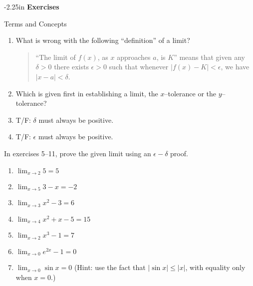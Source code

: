 \begin{adjustwidth*}{}{-2.25in}
\textbf{{\large Exercises}}
\setlength{\columnsep}{25pt}
\begin{multicols*}{2}
\noindent Terms and Concepts \small

\begin{enumerate}[1)]
\item What is wrong with the following ``definition'' of a limit?
	\begin{quote}
``The limit of $f(x)$, as $x$ approaches $a$, is $K$'' means that given any $\delta>0$ there exists $\epsilon>0$ such that whenever $|f(x)-K|< \epsilon$, we have $|x-a|<\delta$.
	\end{quote}
\item Which is given first in establishing a limit, the $x$--tolerance or the $y$--tolerance?
\item T/F: $\delta$ must always be positive.
\item T/F: $\epsilon$ must always be positive.
\end{enumerate} 

 \small

\noindent In exercises 5--11, prove the given limit using an $\epsilon - \delta$ proof.

\begin{enumerate}[1),resume]
\item {$\displaystyle \lim_{x\to 2} 5 = 5$}
\item {$\displaystyle \lim_{x\to 5} 3-x = -2$}
\item {$\displaystyle \lim_{x\to 3} x^2-3 = 6$}
\item {$\displaystyle \lim_{x\to 4} x^2+x-5 = 15$}
\item {$\displaystyle \lim_{x\to 2} x^3-1 = 7$}
\item {$\displaystyle \lim_{x\to 0} e^{2x}-1 = 0$}
\item {$\displaystyle \lim_{x\to 0} \sin x= 0$ (Hint: use the fact that $|\sin x| \leq |x|$, with equality only when $x=0$.)}
\end{enumerate}

\vspace{.5cm}

\end{multicols*}
\end{adjustwidth*}
\afterexercises